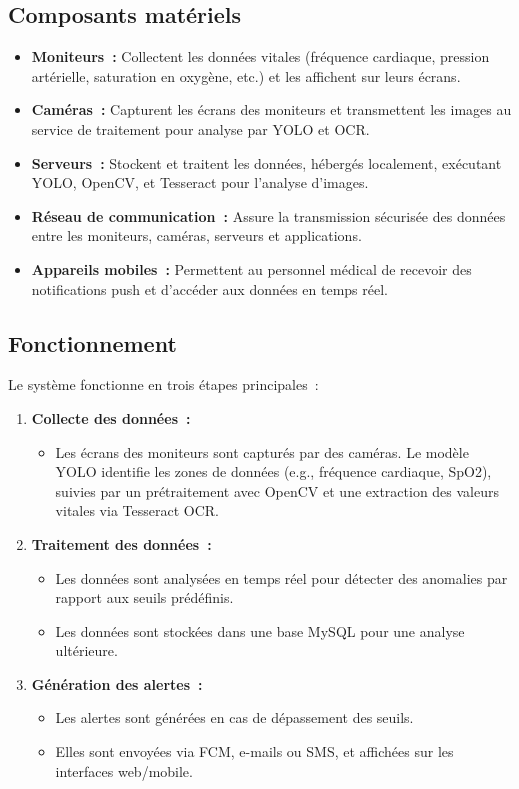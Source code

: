 \subsection{Composants matériels}
\label{subsec:composants_materiels}
\begin{itemize}
    \item \textbf{Moniteurs~:} Collectent les données vitales (fréquence cardiaque, pression artérielle, saturation en oxygène, etc.) et les affichent sur leurs écrans.
    \item \textbf{Caméras~:} Capturent les écrans des moniteurs et transmettent les images au service de traitement pour analyse par YOLO et OCR. %
    \item \textbf{Serveurs~:} Stockent et traitent les données, hébergés localement, exécutant YOLO, OpenCV, et Tesseract pour l’analyse d’images. %
    \item \textbf{Réseau de communication~:} Assure la transmission sécurisée des données entre les moniteurs, caméras, serveurs et applications.
    \item \textbf{Appareils mobiles~:} Permettent au personnel médical de recevoir des notifications push et d'accéder aux données en temps réel.
\end{itemize}

\subsection{Fonctionnement}
\label{subsec:fonctionnement}
Le système fonctionne en trois étapes principales~:
\begin{enumerate}
    \item \textbf{Collecte des données~:}
    \begin{itemize}
        \item Les écrans des moniteurs sont capturés par des caméras. Le modèle YOLO identifie les zones de données (e.g., fréquence cardiaque, SpO2), suivies par un prétraitement avec OpenCV et une extraction des valeurs vitales via Tesseract OCR. %
    \end{itemize}
    \item \textbf{Traitement des données~:}
    \begin{itemize}
        \item Les données sont analysées en temps réel pour détecter des anomalies par rapport aux seuils prédéfinis.
        \item Les données sont stockées dans une base MySQL pour une analyse ultérieure.
    \end{itemize}
    \item \textbf{Génération des alertes~:}
    \begin{itemize}
        \item Les alertes sont générées en cas de dépassement des seuils.
        \item Elles sont envoyées via FCM, e-mails ou SMS, et affichées sur les interfaces web/mobile.
    \end{itemize}
\end{enumerate}

